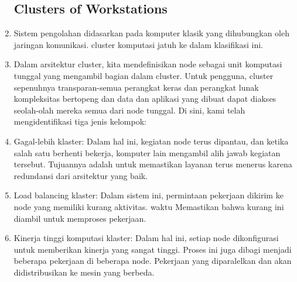 \begin{enumerate}
\subsection{Clusters of Workstations}
\item Sistem pengolahan didasarkan pada komputer klasik yang dihubungkan oleh jaringan komunikasi. cluster komputasi jatuh ke dalam klasifikasi ini.
\item Dalam arsitektur cluster, kita mendefinisikan node sebagai unit komputasi tunggal yang mengambil bagian dalam cluster. Untuk pengguna, cluster sepenuhnya transparan-semua perangkat keras dan perangkat lunak kompleksitas bertopeng dan data dan aplikasi yang dibuat dapat diakses seolah-olah mereka semua dari node tunggal.
\noindent Di sini, kami telah mengidentifikasi tiga jenis kelompok:
\item Gagal-lebih klaster: Dalam hal ini, kegiatan node terus dipantau, dan ketika salah satu berhenti bekerja, komputer lain mengambil alih jawab kegiatan tersebut. Tujuannya adalah untuk memastikan layanan terus menerus karena redundansi dari arsitektur yang baik.
\item Load balancing klaster: Dalam sistem ini, permintaan pekerjaan dikirim ke node yang memiliki kurang aktivitas. waktu Memastikan bahwa kurang ini diambil untuk memproses pekerjaan.
\item Kinerja tinggi komputasi klaster: Dalam hal ini, setiap node dikonfigurasi untuk memberikan kinerja yang sangat tinggi. Proses ini juga dibagi menjadi beberapa pekerjaan di beberapa node. Pekerjaan yang diparalelkan dan akan didistribusikan ke mesin yang berbeda.





\end{enumerate}
